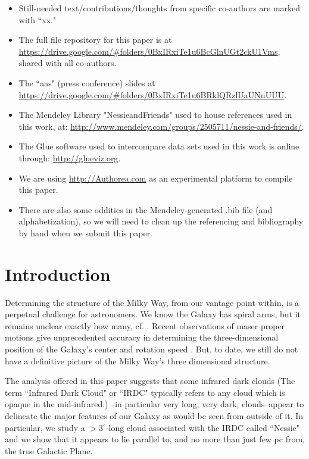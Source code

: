 \documentclass[]{article}
\begin{document}
\begin{itemize}
\item
  Still-needed text/contributions/thoughts from specific co-authors are
  marked with ``xx."
\item
  The full file repository for this paper is at
  \url{https://drive.google.com/#folders/0BxIRxiTe1u6BcGlnUGt2ckU1Vms},
  shared with all co-authors.
\item
  The ``aas" (press conference) slides at
  \url{https://drive.google.com/#folders/0BxIRxiTe1u6BRklQRzlUaUNuUUU}.
\item
  The Mendeley Library "NessieandFriends" used to house references used
  in this work, at:
  \url{http://www.mendeley.com/groups/2505711/nessie-and-friends/}.
\item
  The Glue software used to intercompare data sets used in this work is
  online through: \url{http://glueviz.org}.
\item
  We are using \url{http://Authorea.com} as an experimental platform to
  compile this paper.
\item
  There are also some oddities in the Mendeley-generated .bib file (and
  alphabetization), so we will need to clean up the referencing and
  bibliography by hand when we submit this paper.
\end{itemize}
\section{Introduction}

Determining the structure of the Milky Way, from our vantage point
within, is a perpetual challenge for astronomers. We know the Galaxy has
spiral arms, but it remains unclear exactly how many, cf.
\citep{Vallee2008a}. Recent observations of maser proper motions give
unprecedented accuracy in determining the three-dimensional position of
the Galaxy's center and rotation speed \citep{Reid2009,Brunthaler2011}.
But, to date, we still do not have a definitive picture of the Milky
Way's three dimensional structure.

The analysis offered in this paper suggests that some infrared dark
clouds (The term ``Infrared Dark Cloud" or ``IRDC" typically refers to
any cloud which is opaque in the mid-infrared.) --in particular very
long, very dark, clouds--appear to delineate the major features of our
Galaxy as would be seen from outside of it. In particular, we study a
$>3^{\circ}$-long cloud associated with the IRDC called ``Nessie"
\citep{Jackson2010} and we show that it appears to lie parallel to, and
no more than just few pc from, the true Galactic Plane.
\end{document}
